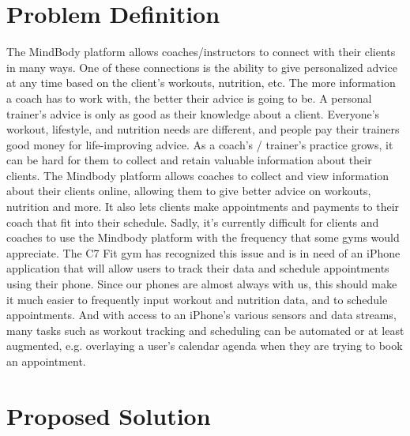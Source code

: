 \documentclass[letterpaper,10pt,titlepage]{article}
\begin{document}
\newpage

\tableofcontents

\newpage

\section{Problem Definition}

The MindBody platform allows coaches/instructors to connect with their clients in many ways. One of these connections is the ability to give personalized advice at any time based on the client's workouts, nutrition, etc. The more information a coach has to work with, the better their advice is going to be. A personal trainer's advice is only as good as their knowledge about a client. Everyone's workout, lifestyle, and nutrition needs are different, and people pay their trainers good money for life-improving advice. As a coach's / trainer's practice grows, it can be hard for them to collect and retain valuable information about their clients. The Mindbody platform allows coaches to collect and view information about their clients online, allowing them to give better advice on workouts, nutrition and more. It also lets clients make appointments and payments to their coach that fit into their schedule. Sadly, it's currently difficult for clients and coaches to use the Mindbody platform with the frequency that some gyms would appreciate. The C7 Fit gym has recognized this issue and is in need of an iPhone application that will allow users to track their data and schedule appointments using their phone. Since our phones are almost always with us, this should make it much easier to frequently input workout and nutrition data, and to schedule appointments. And with access to an iPhone's various sensors and data streams, many tasks such as workout tracking and scheduling can be automated or at least augmented, e.g. overlaying a user's calendar agenda when they are trying to book an appointment.
\section{Proposed Solution}
\end{document}
